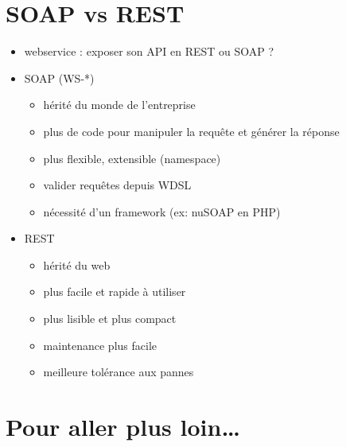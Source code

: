 \hypertarget{soap-vs-rest}{%
\section{SOAP vs REST}\label{soap-vs-rest}}

\begin{itemize}
\tightlist
\item
  webservice : exposer son API en REST ou SOAP ?
\item
  SOAP (WS-*)

  \begin{itemize}
  \tightlist
  \item
    hérité du monde de l'entreprise
  \item
    plus de code pour manipuler la requête et générer la réponse
  \item
    plus flexible, extensible (namespace)
  \item
    valider requêtes depuis WDSL
  \item
    nécessité d'un framework (ex: nuSOAP en PHP)
  \end{itemize}
\item
  REST

  \begin{itemize}
  \tightlist
  \item
    hérité du web
  \item
    plus facile et rapide à utiliser
  \item
    plus lisible et plus compact
  \item
    maintenance plus facile
  \item
    meilleure tolérance aux pannes
  \end{itemize}
\end{itemize}

\hypertarget{pour-aller-plus-loin}{%
\section{Pour aller plus loin\ldots{}}\label{pour-aller-plus-loin}}


